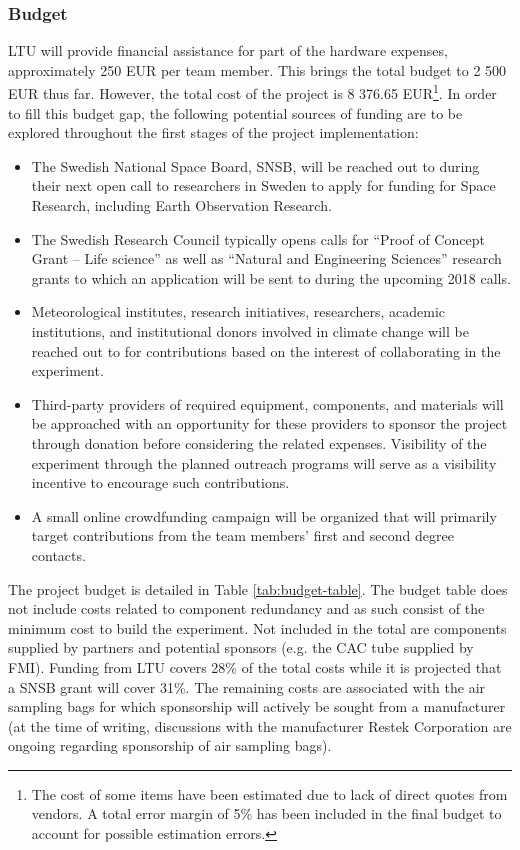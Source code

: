 \pagebreak
\subsubsection{Budget}
LTU will provide financial assistance for part of the hardware expenses, approximately 250 EUR per team member. This brings the total budget to 2 500 EUR thus far. However, the total cost of the project is 8 376.65 EUR\footnote{The cost of some items have been estimated due to lack of direct quotes from vendors. A total error margin of 5\% has been included in the final budget to account for possible estimation errors.}. In order to fill this budget gap, the following potential sources of funding are to be explored throughout the first stages of the project implementation:

\begin{itemize}
    \item The Swedish National Space Board, SNSB, will be reached out to during their next open call to researchers in Sweden to apply for funding for Space Research, including Earth Observation Research.
    \item The Swedish Research Council typically opens calls for \enquote{Proof of Concept Grant – Life science} as well as \enquote{Natural and Engineering Sciences} research grants to which an application will be sent to during the upcoming 2018 calls.
    \item Meteorological institutes, research initiatives, researchers, academic institutions, and institutional donors involved in climate change will be reached out to for contributions based on the interest of collaborating in the experiment.
    \item Third-party providers of required equipment, components, and materials will be approached with an opportunity for these providers to sponsor the project through donation before considering the related expenses. Visibility of the experiment through the planned outreach programs will serve as a visibility incentive to encourage such contributions.
    \item A small online crowdfunding campaign will be organized that will primarily target contributions from the team members' first and second degree contacts.
\end{itemize}

The project budget is detailed in Table \ref{tab:budget-table}. The budget table does not include costs related to component redundancy and as such consist of the minimum cost to build the experiment. Not included in the total are components supplied by partners and potential sponsors (e.g. the CAC tube supplied by FMI). Funding from LTU covers 28\% of the total costs while it is projected that a SNSB grant will cover 31\%. The remaining costs are associated with the air sampling bags for which sponsorship will actively be sought from a manufacturer (at the time of writing, discussions with the manufacturer Restek Corporation are ongoing regarding sponsorship of air sampling bags). 

